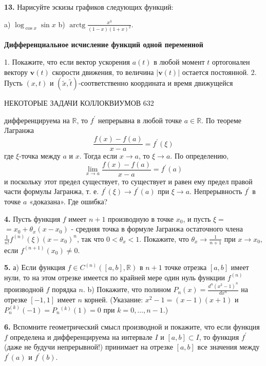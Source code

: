 \documentclass{article}
\newcommand\hr{\par\vspace{-.5\ht\strutbox}\noindent\hrulefill\par}
\begin{document}
\textbf{13. }Нарисуйте эскизы графиков следующих функций:

a) $\log _{\cos x} \sin x$
b) $\operatorname{arctg} \frac{x^3}{(1-x)(1+x)^2}$.

\bigskip
\bgroup
\obeylines
\textbf{Дифференциальное исчисление функций
одной переменной}
\egroup
\bigskip

1. Покажите, что если вектор ускорения $a(t)$ в любой момент $t$ ортогонален вектору $\boldsymbol{v}(t)$ скорости движения, то величина $|\boldsymbol{v}(t)|$ остается постоянной.
2. Пусть $(x, t)$ и $(\tilde{x}, \tilde{t})$-соответственно координата и время движущейся

\newpage
\thispagestyle{empty}

НЕКОТОРЫЕ ЗАДАЧИ КОЛЛОКВИУМОВ \mbox{}\hfill 632

\hr
\bigskip

дифференцируема на $\mathbb{R}$, то $f^{\prime}$ непрерывна в любой точке $a \in \mathbb{R}$. По теореме Лагранжа
$$
\frac{f(x)-f(a)}{x-a}=f^{\prime}(\xi)
$$
где $\xi$-точка между $a$ и $x$. Тогда если $x \rightarrow a$, то $\xi \rightarrow a$. По определению,
$$
\lim _{x \rightarrow a} \frac{f(x)-f(a)}{x-a}=f^{\prime}(a)
$$
и поскольку этот предел существует, то существует и равен ему предел правой части формулы Јагранжа, т. е. $f^{\prime}(\xi) \rightarrow f^{\prime}(a)$ при $\xi \rightarrow a$. Непрерывность $f^{\prime}$ в точке $a$ «доказана». Где ошибка?

\textbf{4.} Пусть функция $f$ имеет $n+1$ производную в точке $x_0$, и пусть $\xi=$ $=x_0+\theta_x\left(x-x_0\right)$ - средняя точка в формуле Јагранжа остаточного члена $\frac{1}{n !} f^{(n)}(\xi)\left(x-x_0\right)^n$, так что $0<\theta_x<1$. Покажите, что $\theta_x \rightarrow \frac{1}{n+1}$ при $x \rightarrow x_0$, если $f^{(n+1)}\left(x_0\right) \neq 0$.

\textbf{5.} а) Если функция $f \in C^{(n)}([a, b], \mathbb{R})$ в $n+1$ точке отрезка $[a, b]$ имеет нули, то на этом отрезке имеется по крайней мере один нуль функции $f^{(n)}$ производной $f$ порядка $n$.
b) Покажите, что полином $P_n(x)=\frac{d^n\left(x^2-1\right)^n}{d x^n}$ на отрезке $[-1,1]$ имеет $n$ корней. (Указание: $x^2-1=(x-1)(x+1)$ и $P_n^{(k)}(-1)=P_n{ }^{(k)}(1)=0$ при $k=0, \ldots, n-1$.)

\textbf{6.} Вспомните геометрический смысл производной и покажите, что если функция $f$ определена и дифференцируема на интервале $I$ и $[a, b] \subset I$, то функция $f^{\prime}$ (даже не будучи непрерывной!) принимает на отрезке $[a, b]$ все значения между $f^{\prime}(a)$ и $f^{\prime}(b)$.
\end{document}

